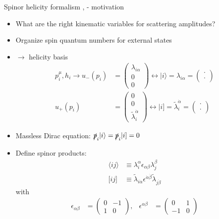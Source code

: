 \documentclass[10pt]{beamer}
\begin{document}
\begin{frame}{Spinor helicity formalism \cite{dixon2016}, \cite{berends81} - motivation}

    \begin{itemize}[<+->]
        \item[] What are the right kinematic variables for scattering amplitudes?
        \item[] Organize spin quantum numbers for external states
        \item[] $\rightarrow$ \alert{helicity basis} {\scriptsize
        \begin{align*}
            p^{\mu}_i, h_i \rightarrow u_{-}(p_i) &= \begin{pmatrix} \lambda_{i \alpha} \\ 0 \\ 0\end{pmatrix} \leftrightarrow | i \rangle = \lambda_{i \alpha} = \begin{pmatrix}\cdot \\ \cdot\end{pmatrix} \\
            u_{+}(p_i) &= \begin{pmatrix}0 \\ 0 \\ \tilde{\lambda}_{i}^{\dot{\alpha}} \end{pmatrix} \leftrightarrow | i \rbrack = \tilde{\lambda}^{\dot{\alpha}}_i = \begin{pmatrix}\cdot \\ \cdot\end{pmatrix}
        \end{align*}
        }
        \item[] Massless \alert{Dirac equation}: {\scriptsize $\slashed{p}_i | i \rangle = \slashed{p}_i | i \rbrack = 0$ }
        \item[] Define \alert{spinor products}: {\scriptsize
        \begin{align*}
            \langle ij \rangle &\equiv \lambda^{\alpha}_i \epsilon_{\alpha \beta} \lambda^{\beta}_j \\
            \lbrack ij \rbrack &\equiv \tilde{\lambda}_{i \dot{\alpha}} \epsilon^{\dot{\alpha} \dot{\beta}} \tilde{\lambda}_{j \dot{\beta}}
        \end{align*}
        } with {\scriptsize
        \begin{align*}
            \epsilon_{\alpha \beta} &= \begin{pmatrix}0 & -1 \\ 1 & 0\end{pmatrix}, & \epsilon^{\alpha \beta} &= \begin{pmatrix}0 & 1 \\ -1 & 0\end{pmatrix}
        \end{align*}
        }
    \end{itemize}

\end{frame}
\end{document}
